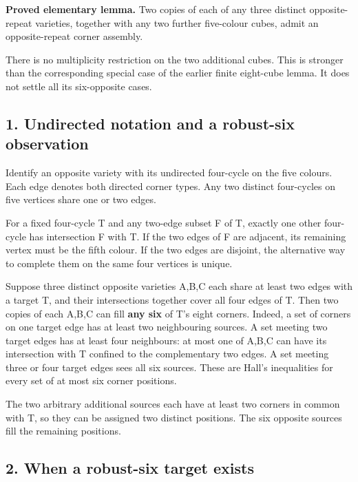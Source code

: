 \documentclass[
  10pt,
]{article}
\begin{document}
\textbf{Proved elementary lemma.} Two copies of each of any three
distinct opposite-repeat varieties, together with any two further
five-colour cubes, admit an opposite-repeat corner assembly.

There is no multiplicity restriction on the two additional cubes. This
is stronger than the corresponding special case of the earlier finite
eight-cube lemma. It does not settle all its six-opposite cases.

\hypertarget{undirected-notation-and-a-robust-six-observation}{%
\subsection*{1. Undirected notation and a robust-six
observation}\label{undirected-notation-and-a-robust-six-observation}}

Identify an opposite variety with its undirected four-cycle on the five
colours. Each edge denotes both directed corner types. Any two distinct
four-cycles on five vertices share one or two edges.

For a fixed four-cycle T and any two-edge subset F of T, exactly one
other four-cycle has intersection F with T. If the two edges of F are
adjacent, its remaining vertex must be the fifth colour. If the two
edges are disjoint, the alternative way to complete them on the same
four vertices is unique.

Suppose three distinct opposite varieties A,B,C each share at least two
edges with a target T, and their intersections together cover all four
edges of T. Then two copies of each A,B,C can fill \textbf{any six} of
T's eight corners. Indeed, a set of corners on one target edge has at
least two neighbouring sources. A set meeting two target edges has at
least four neighbours: at most one of A,B,C can have its intersection
with T confined to the complementary two edges. A set meeting three or
four target edges sees all six sources. These are Hall's inequalities
for every set of at most six corner positions.

The two arbitrary additional sources each have at least two corners in
common with T, so they can be assigned two distinct positions. The six
opposite sources fill the remaining positions.

\hypertarget{when-a-robust-six-target-exists}{%
\subsection*{2. When a robust-six target
exists}\label{when-a-robust-six-target-exists}}
\end{document}
